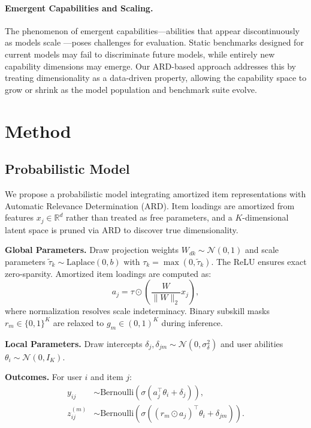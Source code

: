 \documentclass{article}
\theoremstyle{plain}
\theoremstyle{definition}
\theoremstyle{remark}
\begin{document}
\paragraph{Emergent Capabilities and Scaling.}
The phenomenon of emergent capabilities---abilities that appear discontinuously as models scale \cite{wei2022emergent, kaplan2020scaling}---poses challenges for evaluation. Static benchmarks designed for current models may fail to discriminate future models, while entirely new capability dimensions may emerge. Our ARD-based approach addresses this by treating dimensionality as a data-driven property, allowing the capability space to grow or shrink as the model population and benchmark suite evolve.

\section{Method}
\subsection{Probabilistic Model}
We propose a probabilistic model integrating amortized item representations with Automatic Relevance Determination (ARD). Item loadings are amortized from features $x_j \in \mathbb{R}^d$ rather than treated as free parameters, and a $K$-dimensional latent space is pruned via ARD to discover true dimensionality.

\textbf{Global Parameters.}
Draw projection weights $W_{dk} \sim \mathcal{N}(0, 1)$ and scale parameters $\tilde{\tau}_k \sim \text{Laplace}(0, b)$ with $\tau_k = \max(0, \tilde{\tau}_k)$. The ReLU ensures exact zero-sparsity. Amortized item loadings are computed as:
\begin{equation}
\label{eq:amortized_proj}
a_j = \tau \odot \left( \frac{W}{\|W\|_2} x_j \right),  
\end{equation}
where normalization resolves scale indeterminacy. Binary subskill masks $r_m \in \{0,1\}^K$ are relaxed to $g_m \in (0,1)^K$ during inference.

\textbf{Local Parameters.}
Draw intercepts $\delta_j, \delta_{jm} \sim \mathcal{N}(0, \sigma_\delta^2)$ and user abilities $\theta_i \sim \mathcal{N}(0, I_K)$.

\textbf{Outcomes.}
For user $i$ and item $j$:
\begin{align}
y_{ij} &\sim \mathrm{Bernoulli}\left( \sigma(a_j^\top \theta_i + \delta_j) \right), \\
z^{(m)}_{ij} &\sim \mathrm{Bernoulli}\left( \sigma((r_m \odot a_j)^\top \theta_i + \delta_{jm}) \right).
\end{align}
\end{document}
